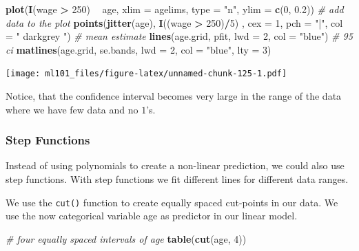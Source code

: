 \documentclass[]{article}
\newenvironment{Shaded}{\begin{snugshade}}{\end{snugshade}}
\newcommand{\CommentTok}[1]{\textcolor[rgb]{0.56,0.35,0.01}{\textit{#1}}}
\newcommand{\DataTypeTok}[1]{\textcolor[rgb]{0.13,0.29,0.53}{#1}}
\newcommand{\DecValTok}[1]{\textcolor[rgb]{0.00,0.00,0.81}{#1}}
\newcommand{\FloatTok}[1]{\textcolor[rgb]{0.00,0.00,0.81}{#1}}
\newcommand{\KeywordTok}[1]{\textcolor[rgb]{0.13,0.29,0.53}{\textbf{#1}}}
\newcommand{\NormalTok}[1]{#1}
\newcommand{\OperatorTok}[1]{\textcolor[rgb]{0.81,0.36,0.00}{\textbf{#1}}}
\newcommand{\StringTok}[1]{\textcolor[rgb]{0.31,0.60,0.02}{#1}}
\begin{document}
\begin{Shaded}
\begin{Highlighting}[]
\KeywordTok{plot}\NormalTok{(}\KeywordTok{I}\NormalTok{(wage }\OperatorTok{>}\StringTok{ }\DecValTok{250}\NormalTok{) }\OperatorTok{~}\StringTok{ }\NormalTok{age, }\DataTypeTok{xlim =}\NormalTok{ agelims, }\DataTypeTok{type =} \StringTok{"n"}\NormalTok{, }\DataTypeTok{ylim =} \KeywordTok{c}\NormalTok{(}\DecValTok{0}\NormalTok{, }\FloatTok{0.2}\NormalTok{))}
\CommentTok{# add data to the plot}
\KeywordTok{points}\NormalTok{(}\KeywordTok{jitter}\NormalTok{(age), }\KeywordTok{I}\NormalTok{((wage }\OperatorTok{>}\StringTok{ }\DecValTok{250}\NormalTok{)}\OperatorTok{/}\DecValTok{5}\NormalTok{) , }\DataTypeTok{cex =} \DecValTok{1}\NormalTok{, }\DataTypeTok{pch =} \StringTok{"|"}\NormalTok{, }\DataTypeTok{col =} \StringTok{" darkgrey "}\NormalTok{)}
\CommentTok{# mean estimate}
\KeywordTok{lines}\NormalTok{(age.grid, pfit, }\DataTypeTok{lwd =} \DecValTok{2}\NormalTok{, }\DataTypeTok{col =} \StringTok{"blue"}\NormalTok{)}
\CommentTok{# 95 ci}
\KeywordTok{matlines}\NormalTok{(age.grid, se.bands, }\DataTypeTok{lwd =} \DecValTok{2}\NormalTok{, }\DataTypeTok{col =} \StringTok{"blue"}\NormalTok{, }\DataTypeTok{lty =} \DecValTok{3}\NormalTok{)}
\end{Highlighting}
\end{Shaded}

\texttt{[image: ml101\_files/figure-latex/unnamed-chunk-125-1.pdf]}

Notice, that the confidence interval becomes very large in the range of the data where we have few data and no \(1\)'s.

\hypertarget{step-functions}{%
\subsubsection{Step Functions}\label{step-functions}}

Instead of using polynomials to create a non-linear prediction, we could also use step functions. With step functions we fit different lines for different data ranges.

We use the \texttt{cut()} function to create equally spaced cut-points in our data. We use the now categorical variable age as predictor in our linear model.

\begin{Shaded}
\begin{Highlighting}[]
\CommentTok{# four equally spaced intervals of age}
\KeywordTok{table}\NormalTok{(}\KeywordTok{cut}\NormalTok{(age, }\DecValTok{4}\NormalTok{))}
\end{Highlighting}
\end{Shaded}
\end{document}
